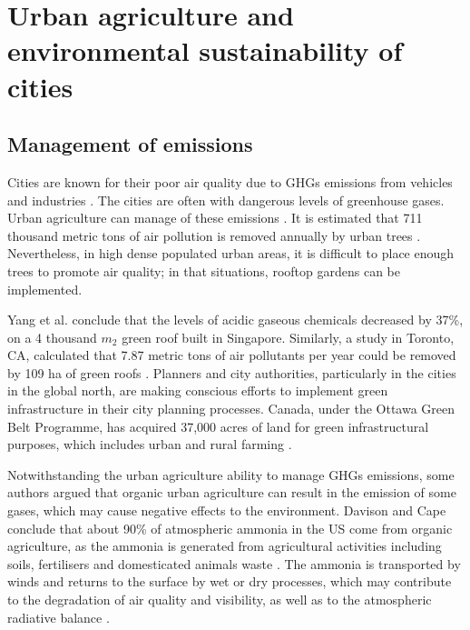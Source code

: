 \section{Urban agriculture and environmental sustainability of cities}
\label{sec:environmentalDim}

\subsection{Management of emissions}

Cities are known for their poor air quality due to GHGs emissions from vehicles and industries \cite{Heather2012}. The cities are often with dangerous levels of greenhouse gases. Urban agriculture can manage of these emissions \cite{Padgham2015}. It is estimated that 711 thousand metric tons of air pollution is removed annually by urban trees \cite{Yang2008}. Nevertheless, in high dense populated urban areas, it is difficult to place enough trees to promote air quality; in that situations, rooftop gardens can be implemented.

Yang et al. \cite{Yang2008} conclude that the levels of acidic gaseous chemicals decreased by 37\%, on a 4 thousand $m_{2}$ green roof built in Singapore. Similarly, a study in Toronto, CA, calculated that 7.87 metric tons of air pollutants per year could be removed by 109 ha of green roofs \cite{Yang2008}. Planners and city authorities, particularly in the cities in the global north, are making conscious efforts to implement green infrastructure in their city planning processes. Canada, under the Ottawa Green Belt Programme, has acquired 37,000 acres of land for green infrastructural purposes, which includes urban and rural farming \cite{Pearson2010}.

Notwithstanding the urban agriculture ability to manage GHGs emissions, some authors argued that organic urban agriculture can result in the emission of some gases, which may cause negative effects to the environment. Davison and Cape \cite{Davison2003} conclude that about 90\% of atmospheric ammonia in the US come from organic agriculture, as the ammonia is generated from agricultural activities including soils, fertilisers and domesticated animals waste \cite{Paulot2014}. The ammonia is transported by winds and returns to the surface by wet or dry processes, which may contribute to the degradation of air quality and visibility, as well as to the atmospheric radiative balance \cite{Aneja2015}.

